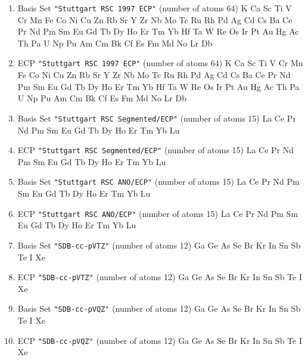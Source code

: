 \begin{enumerate}
\item Basis Set \verb#"Stuttgart RSC 1997 ECP"# (number of atoms 64)  \newline
  K Ca Sc Ti V Cr Mn Fe Co Ni Cu Zn Rb Sr Y Zr Nb Mo Tc Ru Rh Pd Ag Cd Cs
 Ba Ce Pr Nd Pm Sm Eu Gd Tb Dy Ho Er Tm Yb Hf Ta W Re Os Ir Pt Au Hg Ac Th
 Pa U Np Pu Am Cm Bk Cf Es Fm Md No Lr Db


\item ECP \verb#"Stuttgart RSC 1997 ECP"# (number of atoms 64)  \newline
  K Ca Sc Ti V Cr Mn Fe Co Ni Cu Zn Rb Sr Y Zr Nb Mo Tc Ru Rh Pd Ag Cd Cs
 Ba Ce Pr Nd Pm Sm Eu Gd Tb Dy Ho Er Tm Yb Hf Ta W Re Os Ir Pt Au Hg Ac Th
 Pa U Np Pu Am Cm Bk Cf Es Fm Md No Lr Db


\item Basis Set \verb#"Stuttgart RSC Segmented/ECP"# (number of atoms 15)  \newline
  La Ce Pr Nd Pm Sm Eu Gd Tb Dy Ho Er Tm Yb Lu


\item ECP \verb#"Stuttgart RSC Segmented/ECP"# (number of atoms 15)  \newline
  La Ce Pr Nd Pm Sm Eu Gd Tb Dy Ho Er Tm Yb Lu


\item Basis Set \verb#"Stuttgart RSC ANO/ECP"# (number of atoms 15)  \newline
  La Ce Pr Nd Pm Sm Eu Gd Tb Dy Ho Er Tm Yb Lu


\item ECP \verb#"Stuttgart RSC ANO/ECP"# (number of atoms 15)  \newline
  La Ce Pr Nd Pm Sm Eu Gd Tb Dy Ho Er Tm Yb Lu

\item Basis Set \verb#"SDB-cc-pVTZ"# (number of atoms 12)  \newline
  Ga Ge As Se Br Kr In Sn Sb Te I Xe


\item ECP \verb#"SDB-cc-pVTZ"# (number of atoms 12)  \newline
  Ga Ge As Se Br Kr In Sn Sb Te I Xe


\item Basis Set \verb#"SDB-cc-pVQZ"# (number of atoms 12)  \newline
  Ga Ge As Se Br Kr In Sn Sb Te I Xe


\item ECP \verb#"SDB-cc-pVQZ"# (number of atoms 12)  \newline
  Ga Ge As Se Br Kr In Sn Sb Te I Xe



\end{enumerate}
